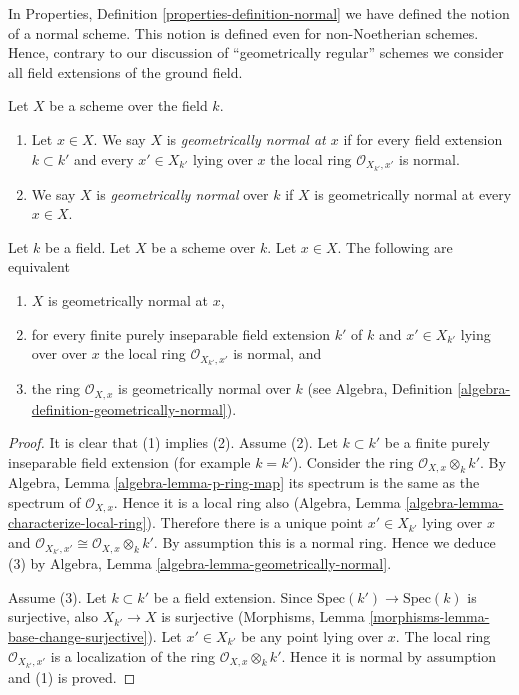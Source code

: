 \noindent
In Properties, Definition \ref{properties-definition-normal}
we have defined the notion of a normal scheme.
This notion is defined even for non-Noetherian
schemes. Hence, contrary to our discussion of
``geometrically regular'' schemes we consider all
field extensions of the ground field.

\begin{definition}
\label{definition-geometrically-normal}
Let $X$ be a scheme over the field $k$.
\begin{enumerate}
\item Let $x \in X$. We say $X$ is
{\it geometrically normal at $x$} if for every
field extension $k \subset k'$ and every $x' \in X_{k'}$ lying over $x$
the local ring $\mathcal{O}_{X_{k'}, x'}$ is normal.
\item We say $X$ is {\it geometrically normal} over $k$ if $X$
is geometrically normal at every $x \in X$.
\end{enumerate}
\end{definition}

\begin{lemma}
\label{lemma-geometrically-normal-at-point}
Let $k$ be a field.
Let $X$ be a scheme over $k$.
Let $x \in X$.
The following are equivalent
\begin{enumerate}
\item $X$ is geometrically normal at $x$,
\item for every finite purely inseparable field extension $k'$ of $k$
and $x' \in X_{k'}$ lying over over $x$ the local ring
$\mathcal{O}_{X_{k'}, x'}$ is normal, and
\item the ring $\mathcal{O}_{X, x}$ is geometrically
normal over $k$ (see
Algebra, Definition \ref{algebra-definition-geometrically-normal}).
\end{enumerate}
\end{lemma}

\begin{proof}
It is clear that (1) implies (2). Assume (2). Let $k \subset k'$ be a finite
purely inseparable field extension (for example $k = k'$). Consider the ring
$\mathcal{O}_{X, x} \otimes_k k'$.
By Algebra, Lemma \ref{algebra-lemma-p-ring-map}
its spectrum is the same as the spectrum of $\mathcal{O}_{X, x}$.
Hence it is a local ring also
(Algebra, Lemma \ref{algebra-lemma-characterize-local-ring}).
Therefore there is a unique point $x' \in X_{k'}$ lying over $x$
and $\mathcal{O}_{X_{k'}, x'} \cong \mathcal{O}_{X, x} \otimes_k k'$.
By assumption this is a normal ring. Hence we deduce (3) by
Algebra, Lemma
\ref{algebra-lemma-geometrically-normal}.

\medskip\noindent
Assume (3). Let $k \subset k'$ be a field extension. Since
$\text{Spec}(k') \to \text{Spec}(k)$ is surjective, also
$X_{k'} \to X$ is surjective
(Morphisms, Lemma \ref{morphisms-lemma-base-change-surjective}).
Let $x' \in X_{k'}$ be any point lying over $x$.
The local ring $\mathcal{O}_{X_{k'}, x'}$
is a localization of the ring $\mathcal{O}_{X, x} \otimes_k k'$.
Hence it is normal by assumption and (1) is proved.
\end{proof}

